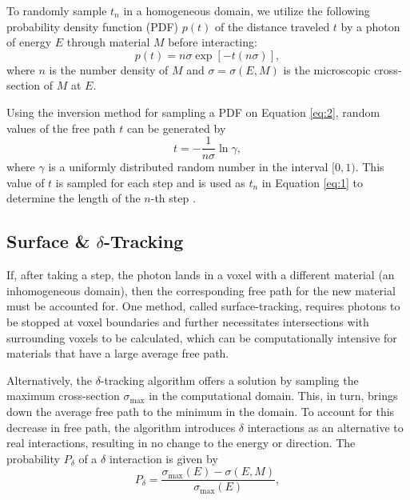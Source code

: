 \par To randomly sample $t_n$ in a homogeneous domain, we utilize the following probability density function (PDF) $p(t)$ of the distance traveled $t$ by a photon of energy $E$ through material $M$ before interacting:
\begin{equation} \label{eq:2}
    p(t) = n\sigma \exp\left[-t(n\sigma)\right],
\end{equation}
where $n$ is the number density of $M$ and $\sigma = \sigma(E, M)$ is the microscopic cross-section of $M$ at $E$.
\par Using the inversion method for sampling a PDF on Equation \ref{eq:2}, random values of the free path $t$ can be generated by
\begin{equation}
    t = -\frac{1}{n\sigma} \ln \gamma, 
\end{equation}
where $\gamma$ is a uniformly distributed random number in the interval $[0, 1)$. This value of $t$ is sampled for each step and is used as $t_n$ in Equation \ref{eq:1} to determine the length of the $n$-th step \cite{vassiliev_monte_2017}.


\subsection{Surface \& $\delta$-Tracking}\label{ssec:delta_tracking}

\par If, after taking a step, the photon lands in a voxel with a different material (an inhomogeneous domain), then the corresponding free path for the new material must be accounted for. One method, called surface-tracking, requires photons to be stopped at voxel boundaries and further necessitates intersections with surrounding voxels to be calculated, which can be computationally intensive for materials that have a large average free path. 
\par Alternatively, the $\delta$-tracking algorithm offers a solution by sampling the maximum cross-section $\sigma_{\text{max}}$ in the computational domain. This, in turn, brings down the average free path to the minimum in the domain. To account for this decrease in free path, the algorithm introduces $\delta$ interactions as an alternative to real interactions, resulting in no change to the energy or direction. The probability $P_{\delta}$ of a $\delta$ interaction is given by 
\begin{equation}
    P_{\delta} = \frac{\sigma_{\text{max}}(E) - \sigma(E, M)}{\sigma_{\text{max}}(E)},
\end{equation}

